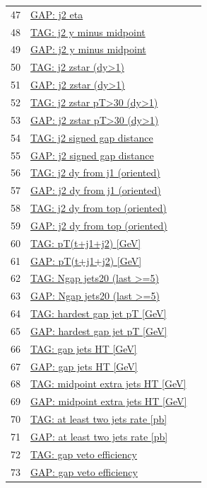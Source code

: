 \documentclass[11pt,a4paper]{article}
\begin{document}
\begin{longtable}{@{}rL{112mm}r@{}}
47 & \hyperref[atlas:p47]{GAP: j2 eta} & \pageref{atlas:p47}\\
48 & \hyperref[atlas:p48]{TAG: j2 y minus midpoint} & \pageref{atlas:p48}\\
49 & \hyperref[atlas:p49]{GAP: j2 y minus midpoint} & \pageref{atlas:p49}\\
50 & \hyperref[atlas:p50]{TAG: j2 zstar (dy>1)} & \pageref{atlas:p50}\\
51 & \hyperref[atlas:p51]{GAP: j2 zstar (dy>1)} & \pageref{atlas:p51}\\
52 & \hyperref[atlas:p52]{TAG: j2 zstar pT>30 (dy>1)} & \pageref{atlas:p52}\\
53 & \hyperref[atlas:p53]{GAP: j2 zstar pT>30 (dy>1)} & \pageref{atlas:p53}\\
54 & \hyperref[atlas:p54]{TAG: j2 signed gap distance} & \pageref{atlas:p54}\\
55 & \hyperref[atlas:p55]{GAP: j2 signed gap distance} & \pageref{atlas:p55}\\
56 & \hyperref[atlas:p56]{TAG: j2 dy from j1 (oriented)} & \pageref{atlas:p56}\\
57 & \hyperref[atlas:p57]{GAP: j2 dy from j1 (oriented)} & \pageref{atlas:p57}\\
58 & \hyperref[atlas:p58]{TAG: j2 dy from top (oriented)} & \pageref{atlas:p58}\\
59 & \hyperref[atlas:p59]{GAP: j2 dy from top (oriented)} & \pageref{atlas:p59}\\
60 & \hyperref[atlas:p60]{TAG: pT(t+j1+j2) [GeV]} & \pageref{atlas:p60}\\
61 & \hyperref[atlas:p61]{GAP: pT(t+j1+j2) [GeV]} & \pageref{atlas:p61}\\
62 & \hyperref[atlas:p62]{TAG: Ngap jets20 (last >=5)} & \pageref{atlas:p62}\\
63 & \hyperref[atlas:p63]{GAP: Ngap jets20 (last >=5)} & \pageref{atlas:p63}\\
64 & \hyperref[atlas:p64]{TAG: hardest gap jet pT [GeV]} & \pageref{atlas:p64}\\
65 & \hyperref[atlas:p65]{GAP: hardest gap jet pT [GeV]} & \pageref{atlas:p65}\\
66 & \hyperref[atlas:p66]{TAG: gap jets HT [GeV]} & \pageref{atlas:p66}\\
67 & \hyperref[atlas:p67]{GAP: gap jets HT [GeV]} & \pageref{atlas:p67}\\
68 & \hyperref[atlas:p68]{TAG: midpoint extra jets HT [GeV]} & \pageref{atlas:p68}\\
69 & \hyperref[atlas:p69]{GAP: midpoint extra jets HT [GeV]} & \pageref{atlas:p69}\\
70 & \hyperref[atlas:p70]{TAG: at least two jets rate [pb]} & \pageref{atlas:p70}\\
71 & \hyperref[atlas:p71]{GAP: at least two jets rate [pb]} & \pageref{atlas:p71}\\
72 & \hyperref[atlas:p72]{TAG: gap veto efficiency} & \pageref{atlas:p72}\\
73 & \hyperref[atlas:p73]{GAP: gap veto efficiency} & \pageref{atlas:p73}\\
\end{longtable}
\end{document}
